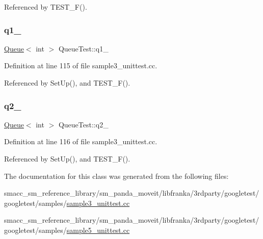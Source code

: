 Referenced by T\+E\+S\+T\+\_\+\+F().

\mbox{\label{classQueueTest_a1e55594e71820ba0f1b09591fb328c30}} 
\subsubsection{\texorpdfstring{q1\+\_\+}{q1\_}}
{\footnotesize\ttfamily \hyperlink{classQueue}{Queue}$<$ int $>$ Queue\+Test\+::q1\+\_\+\hspace{0.3cm}{\ttfamily [protected]}}



Definition at line 115 of file sample3\+\_\+unittest.\+cc.



Referenced by Set\+Up(), and T\+E\+S\+T\+\_\+\+F().

\mbox{\label{classQueueTest_aeb7a2e3f6ce2d97d84eb1e01468adc2f}} 
\subsubsection{\texorpdfstring{q2\+\_\+}{q2\_}}
{\footnotesize\ttfamily \hyperlink{classQueue}{Queue}$<$ int $>$ Queue\+Test\+::q2\+\_\+\hspace{0.3cm}{\ttfamily [protected]}}



Definition at line 116 of file sample3\+\_\+unittest.\+cc.



Referenced by Set\+Up(), and T\+E\+S\+T\+\_\+\+F().



The documentation for this class was generated from the following files\+:\begin{DoxyCompactItemize}
\item 
smacc\+\_\+sm\+\_\+reference\+\_\+library/sm\+\_\+panda\+\_\+moveit/libfranka/3rdparty/googletest/googletest/samples/\hyperlink{sample3__unittest_8cc}{sample3\+\_\+unittest.\+cc}\item 
smacc\+\_\+sm\+\_\+reference\+\_\+library/sm\+\_\+panda\+\_\+moveit/libfranka/3rdparty/googletest/googletest/samples/\hyperlink{sample5__unittest_8cc}{sample5\+\_\+unittest.\+cc}\end{DoxyCompactItemize}
